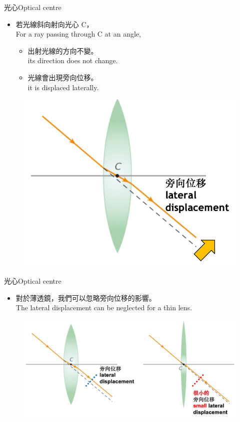 \documentclass[beamer=true]{standalone}
\begin{document}
\begin{frame}{光心Optical centre}

    \begin{itemize}
        \item 若光線斜向射向光心 C，\\For a ray passing through C at an angle,
              \begin{itemize}
                  \item 出射光線的方向不變。\\its direction does not change.
                  \item 光線會出現旁向位移。\\it is displaced laterally.
              \end{itemize}
    \end{itemize}
    \begin{figure}
        \centering
        \includegraphics[width=0.5\linewidth]{assets/98ncu238uc9823rcc.png}


    \end{figure}
\end{frame}

\begin{frame}{光心Optical centre}
    \begin{itemize}
        \item 對於薄透鏡，我們可以忽略旁向位移的影響。\\The lateral displacement can be neglected for a thin lens.
    \end{itemize}
    \begin{figure}
        \centering
        \includegraphics[width=1\linewidth]{assets/d9n823f.png}


    \end{figure}
\end{frame}
\end{document}
